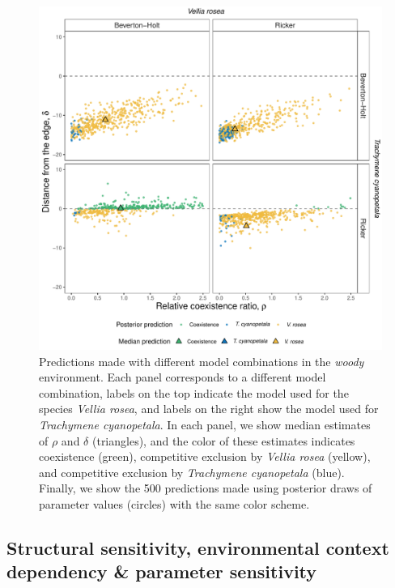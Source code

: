 \begin{refsection}
\begin{figure}[H]
  \centerline{\includegraphics[width=1\textwidth]{figures/chapter3_fig4}}
  \caption[Predictions made with different model combinations in the \textit{woody} environment]{Predictions made with different model combinations in the \textit{woody} environment. Each panel corresponds to a different model combination, labels on the top indicate the model used for the species \textit{Vellia rosea}, and labels on the right show  the model used for \textit{Trachymene cyanopetala}.  In each panel, we show median estimates of $\rho$ and $\delta$ (triangles), and the color of these estimates indicates coexistence (green), competitive exclusion by \textit{Vellia rosea} (yellow), and competitive exclusion by \textit{Trachymene cyanopetala} (blue). Finally, we show the 500 predictions made using posterior draws of parameter values (circles) with the same color scheme.}
    \label{fig:woody}
\end{figure}

\subsection{ Structural sensitivity, environmental context dependency \& parameter sensitivity }


\end{refsection}
